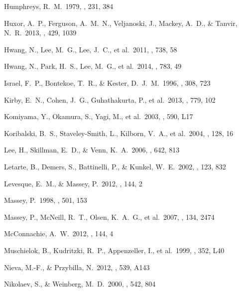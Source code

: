 \documentclass[iop]{emulateapj}
\begin{document}
\begin{thebibliography}{}
 Humphreys, R.~M.\ 1979, 
\apj, 231, 384 

 Huxor, A.~P., Ferguson, 
A.~M.~N., Veljanoski, J., Mackey, A.~D., 
\& Tanvir, N.~R.\ 2013, \mnras, 429, 1039 

 Hwang, N., Lee, M.~G., 
Lee, J.~C., et al.\ 2011, \apj, 738, 58 

 Hwang, N., Park, H.~S., 
Lee, M.~G., et al.\ 2014, \apj, 783, 49 

 Israel, F.~P., Bontekoe, T.~R., \& Kester, D.~J.~M.\ 1996, \aap, 308, 723 

 Kirby, E.~N., Cohen, 
J.~G., Guhathakurta, P., et al.\ 2013, \apj, 779, 102 

 Komiyama, Y., Okamura, 
S., Yagi, M., et al.\ 2003, \apjl, 590, L17 

 Koribalski, B.~S., 
Staveley-Smith, L., Kilborn, V.~A., et al.\ 2004, \aj, 128, 16 

 Lee, H., Skillman, E.~D., 
\& Venn, K.~A.\ 2006, \apj, 642, 813 

 Letarte, B., Demers, 
S., Battinelli, P., \& Kunkel, W.~E.\ 2002, \aj, 123, 832 

 Levesque, E.~M., \& Massey, P.\ 2012, \aj, 144, 2 

 Massey, P.\ 1998, \apj, 501, 
153 

 Massey, P., McNeill, 
R.~T., Olsen, K.~A.~G., et al.\ 2007, \aj, 134, 2474 

 McConnachie, A.~W.\ 2012, 
\aj, 144, 4 

 Muschielok, B., Kudritzki, R.~P., Appenzeller, I., et al.\ 1999, \aap, 352, L40 

 Nieva, M.-F., \& Przybilla, N.\ 2012, \aap, 539, A143 

 Nikolaev, S., \& Weinberg, M.~D.\ 2000, \apj, 542, 804 


\end{thebibliography}
\end{document}
